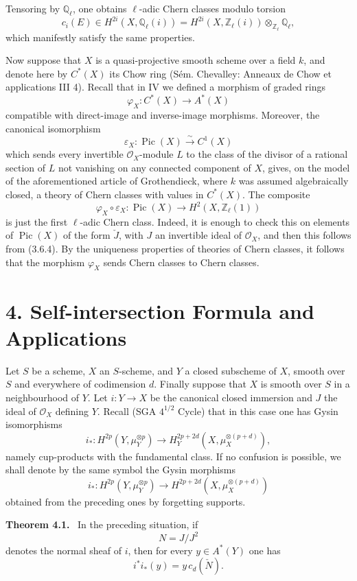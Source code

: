 \documentclass[11pt]{article}
\newenvironment{statement}[1]{\par\medskip\noindent\textbf{#1.}\ }{\par\medskip}
\providecommand{\Pic}{\operatorname{Pic}}
\begin{document}
Tensoring by $\mathbb Q_\ell$, one obtains $\ell$-adic Chern classes modulo torsion
\[
c_i(E)\in H^{2i}(X,\mathbb Q_\ell(i))
=H^{2i}(X,\mathbb Z_\ell(i))\otimes_{\mathbb Z_\ell}\mathbb Q_\ell,
\]
which manifestly satisfy the same properties.

Now suppose that $X$ is a quasi-projective smooth scheme over a field $k$, and denote here by $C^*(X)$ its Chow ring (Sém. Chevalley: Anneaux de Chow et applications III 4). Recall that in IV we defined a morphism of graded rings
\[
\varphi_X:C^*(X)\to A^*(X)
\]
compatible with direct-image and inverse-image morphisms. Moreover, the canonical isomorphism
\[
\varepsilon_X:\Pic(X)\xrightarrow{\sim} C^1(X)
\]
which sends every invertible $\mathcal O_X$-module $L$ to the class of the divisor of a rational section of $L$ not vanishing on any connected component of $X$, gives, on the model of the aforementioned article of Grothendieck, where $k$ was assumed algebraically closed, a theory of Chern classes with values in $C^*(X)$. The composite
\[
\varphi_X\circ\varepsilon_X:\Pic(X)\longrightarrow H^2(X,\mathbb Z_\ell(1))
\]
is just the first $\ell$-adic Chern class. Indeed, it is enough to check this on elements of $\Pic(X)$ of the form $\check J$, with $J$ an invertible ideal of $\mathcal O_X$, and then this follows from (3.6.4). By the uniqueness properties of theories of Chern classes, it follows that the morphism $\varphi_X$ sends Chern classes to Chern classes.

\section*{4. Self-intersection Formula and Applications}

Let $S$ be a scheme, $X$ an $S$-scheme, and $Y$ a closed subscheme of $X$, smooth over $S$ and everywhere of codimension $d$. Finally suppose that $X$ is smooth over $S$ in a neighbourhood of $Y$. Let $i:Y\to X$ be the canonical closed immersion and $J$ the ideal of $\mathcal O_X$ defining $Y$. Recall (SGA $4^{1/2}$ Cycle) that in this case one has Gysin isomorphisms
\[
i_*:H^{2p}(Y,\mu_Y^{\otimes p})
\to H_Y^{2p+2d}(X,\mu_X^{\otimes(p+d)}),
\]
namely cup-products with the fundamental class. If no confusion is possible, we shall denote by the same symbol the Gysin morphisms
\[
i_*:H^{2p}(Y,\mu_Y^{\otimes p})
\to H^{2p+2d}(X,\mu_X^{\otimes(p+d)})
\]
obtained from the preceding ones by forgetting supports.

\begin{statement}{Theorem 4.1}
In the preceding situation, if
\[
N=J/J^2
\]
denotes the normal sheaf of $i$, then for every $y\in A^*(Y)$ one has
\[
i^*i_*(y)=y\,c_d(\check N).
\]
\end{statement}
\end{document}
